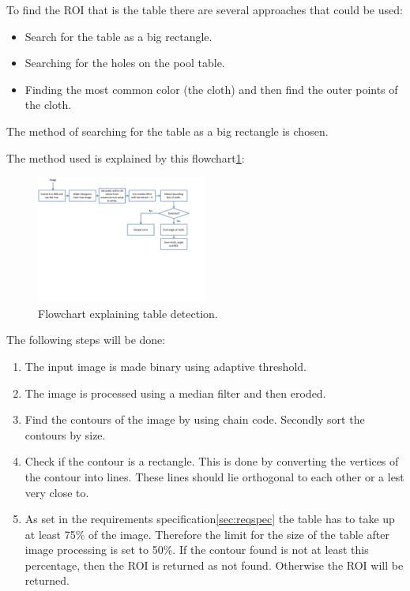 To find the ROI that is the table there are several approaches that could be used:
\begin{itemize}
	\item Search for the table as a big rectangle.
	\item Searching for the holes on the pool table.
	\item Finding the most common color (the cloth) and then find the outer points of the cloth.
\end{itemize}

The method of searching for the table as a big rectangle is chosen. 					%

The method used is explained by this flowchart\ref{fig:detecttable_flowchart}:

\begin{figure}[htpb]
\begin{center}
\leavevmode
\includegraphics[width=0.5\textwidth]{images/tabledetect_flowchart.pdf}
\end{center}
\caption{Flowchart explaining table detection.}
\label{fig:detecttable_flowchart}
\end{figure}

The following steps will be done:
\begin{enumerate}

\item The input image is made binary using adaptive threshold.

\item The image is processed using a median filter and then eroded.

\item Find the contours of the image by using chain code. Secondly sort the contours by size.

\item Check if the contour is a rectangle. This is done by converting the vertices of the contour into lines. These lines should lie orthogonal to each other or a lest very close to.

\item As set in the requirements specification\ref{sec:reqspec} the table has to take up at least 75\% of the image. Therefore the limit for the size of the table after image processing is set to 50\%. If the contour found is not at least this percentage, then the ROI is returned as not found. Otherwise the ROI will be returned.
\end{enumerate}

